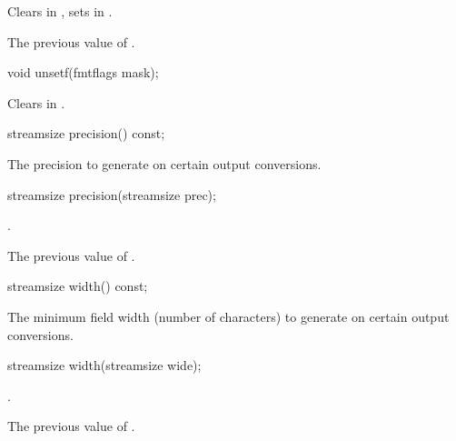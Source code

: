 \begin{itemdescr}
\pnum
\effects
Clears  in
,
sets
in
.

\pnum
\returns
The previous value of
.
\end{itemdescr}

%
\begin{itemdecl}
void unsetf(fmtflags mask);
\end{itemdecl}

\begin{itemdescr}
\pnum
\effects
Clears  in
.
\end{itemdescr}

%
\begin{itemdecl}
streamsize precision() const;
\end{itemdecl}

\begin{itemdescr}
\pnum
\returns
The precision
to generate on certain output conversions.
\end{itemdescr}

%
\begin{itemdecl}
streamsize precision(streamsize prec);
\end{itemdecl}

\begin{itemdescr}
\pnum
\ensures
{}.

\pnum
\returns
The previous value of
.
\end{itemdescr}

%
\begin{itemdecl}
streamsize width() const;
\end{itemdecl}

\begin{itemdescr}
\pnum
\returns
The minimum field width (number of characters) to generate on certain output
conversions.
\end{itemdescr}

%
\begin{itemdecl}
streamsize width(streamsize wide);
\end{itemdecl}

\begin{itemdescr}
\pnum
\ensures
{}.

\pnum
\returns
The previous value of
.
\end{itemdescr}

